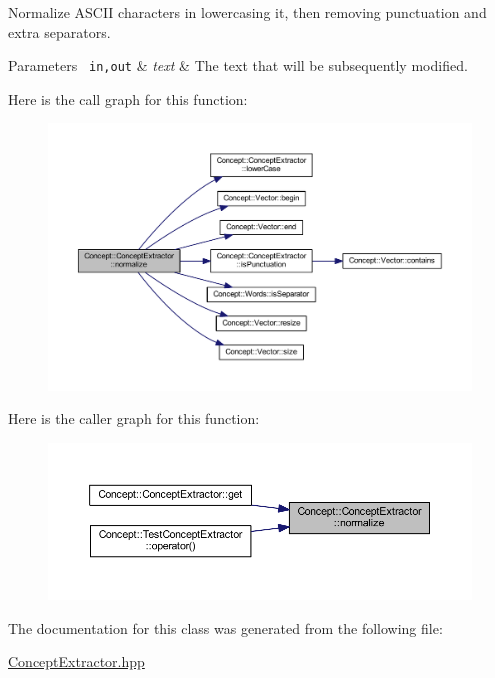 Normalize A\+S\+C\+II characters in lowercasing it, then removing punctuation and extra separators. 
\begin{DoxyParams}[1]{Parameters}
\mbox{\texttt{ in,out}}  & {\em text} & The text that will be subsequently modified. \\
\hline
\end{DoxyParams}
Here is the call graph for this function\+:\nopagebreak
\begin{figure}[H]
\begin{center}
\leavevmode
\includegraphics[width=350pt]{class_concept_1_1_concept_extractor_a48c47fd5c4eaa6b6bfd5edd127d5d492_cgraph}
\end{center}
\end{figure}
Here is the caller graph for this function\+:\nopagebreak
\begin{figure}[H]
\begin{center}
\leavevmode
\includegraphics[width=350pt]{class_concept_1_1_concept_extractor_a48c47fd5c4eaa6b6bfd5edd127d5d492_icgraph}
\end{center}
\end{figure}


The documentation for this class was generated from the following file\+:\begin{DoxyCompactItemize}
\item 
\mbox{\hyperlink{_concept_extractor_8hpp}{Concept\+Extractor.\+hpp}}\end{DoxyCompactItemize}
